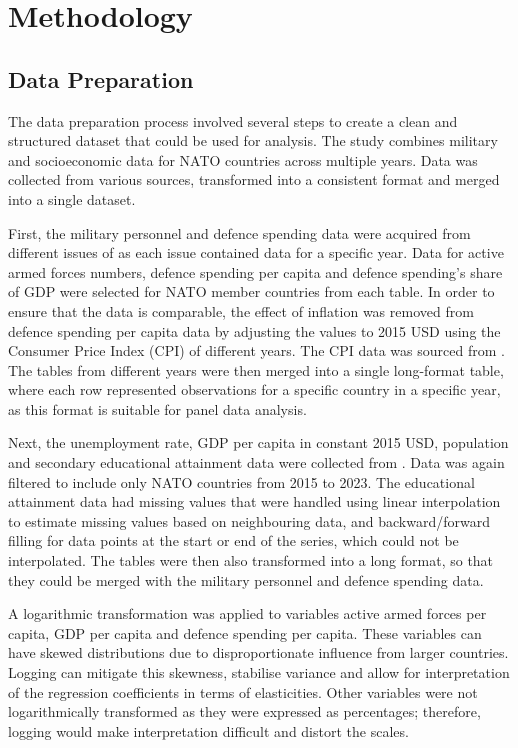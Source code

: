 \chapter{Methodology}

\section{Data Preparation}

The data preparation process involved several steps to create a clean and structured 
dataset that could be used for analysis. The study combines military and socioeconomic 
data for NATO countries across multiple years. Data was collected from various sources,
transformed into a consistent format and merged into a single dataset.

First, the military personnel and defence 
spending data were acquired from different issues of \textcite{noauthor_military_balance_nodate} 
as each issue contained data for a specific year. Data for active armed forces numbers, 
defence spending per capita and defence spending's share of GDP were
selected for NATO member countries from each table.
In order to ensure that the data is comparable, the effect of inflation was removed 
from defence spending per capita data by adjusting the values to 2015 USD using the Consumer Price 
Index (CPI) of different years. The CPI data was sourced from \textcite{federal_reserve_bank_of_minneapolis_consumer_nodate}. 
The tables from different years were then merged into a single long-format table, where
each row represented observations for a specific country in a specific year, as this format is 
suitable for panel data analysis.

Next, the unemployment rate, GDP per capita in constant 2015 USD, population and 
secondary educational attainment data were collected from 
\textcite{noauthor_world_bank_nodate}. Data was again filtered to include 
only NATO countries from 2015 to 2023. 
The educational attainment 
data had missing values that were handled using linear interpolation to estimate missing values 
based on neighbouring data, and backward/forward filling for data points at the start or end 
of the series, which could not be interpolated. The tables were then also transformed into a long format, 
so that they could be 
merged with the military personnel and defence spending data.

A logarithmic transformation was applied to variables active armed forces per capita, GDP per capita 
and defence spending per capita. These variables can have skewed distributions due to disproportionate influence 
from larger countries. 
Logging can mitigate this skewness, stabilise variance and allow for interpretation of the regression 
coefficients in terms of elasticities. Other variables were not logarithmically transformed as they were 
expressed as percentages; therefore, logging would make interpretation difficult and distort the scales.

